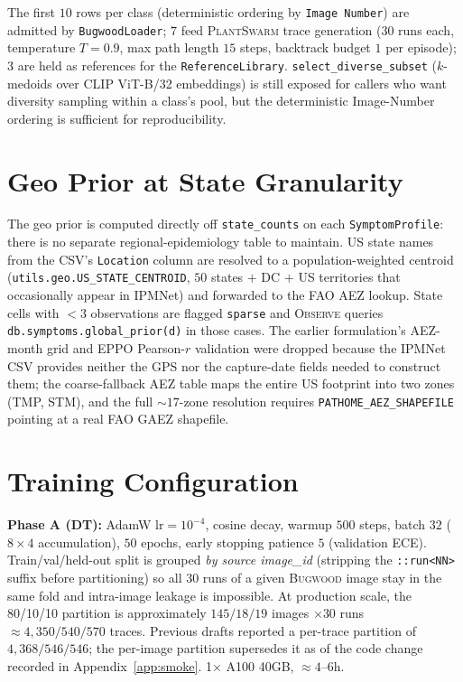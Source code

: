 \documentclass[11pt,twocolumn]{article}
\newcommand{\observe}{\textsc{Observe}\xspace}
\newcommand{\plantswarm}{\textsc{PlantSwarm}\xspace}
\newcommand{\bugwood}{\textsc{Bugwood}\xspace}
\begin{document}
The first $10$ rows per class (deterministic
ordering by \texttt{Image Number}) are admitted
by \texttt{BugwoodLoader}; $7$ feed \plantswarm
trace generation ($30$ runs each,
temperature $T{=}0.9$, max path length $15$
steps, backtrack budget $1$ per episode); $3$
are held as references for the
\texttt{ReferenceLibrary}.
\texttt{select\_diverse\_subset}
($k$-medoids over CLIP ViT-B/32 embeddings) is
still exposed for callers who want diversity
sampling within a class's pool, but the
deterministic Image-Number ordering is
sufficient for reproducibility.

\section{Geo Prior at State Granularity}
\label{app:layer3}

The geo prior is computed directly off
\texttt{state\_counts} on each
\texttt{SymptomProfile}: there is no separate
regional-epidemiology table to maintain.
US state names from the CSV's \texttt{Location}
column are resolved to a population-weighted
centroid
(\texttt{utils.geo.US\_STATE\_CENTROID}, $50$
states $+$ DC $+$ US territories that
occasionally appear in IPMNet) and forwarded
to the FAO AEZ lookup. State cells with
$<3$ observations are flagged \texttt{sparse}
and \observe queries
\texttt{db.symptoms.global\_prior(d)} in
those cases. The earlier formulation's
AEZ-month grid and EPPO Pearson-$r$ validation
were dropped because the IPMNet CSV provides
neither the GPS nor the capture-date fields
needed to construct them; the coarse-fallback
AEZ table maps the entire US footprint into
two zones (TMP, STM), and the full
$\sim$$17$-zone resolution requires
\texttt{PATHOME\_AEZ\_SHAPEFILE} pointing at
a real FAO GAEZ shapefile.

\section{Training Configuration}
\label{app:training}

\textbf{Phase A (DT):} AdamW $\text{lr}{=}10^{-4}$,
cosine decay, warmup $500$ steps, batch $32$
($8{\times}4$ accumulation), $50$ epochs,
early stopping patience $5$ (validation ECE).
Train/val/held-out split is grouped \emph{by source
image\_id} (stripping the \texttt{::run<NN>} suffix
before partitioning) so all $30$ runs of a given
\bugwood image stay in the same fold and intra-image
leakage is impossible. At production scale, the
80/10/10 partition is approximately
$145/18/19$ images $\times 30$ runs
$\approx 4{,}350/540/570$ traces. Previous drafts
reported a per-trace partition of $4{,}368/546/546$;
the per-image partition supersedes it as of the
code change recorded in Appendix~\ref{app:smoke}.
1$\times$ A100 40GB, ${\approx}4$--$6$h.
\end{document}
